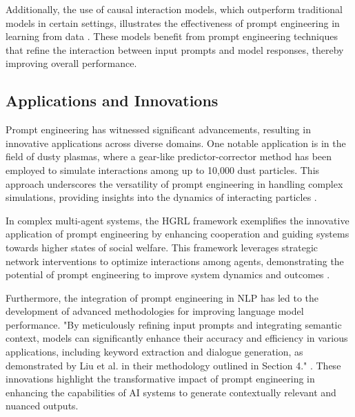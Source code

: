 Additionally, the use of causal interaction models, which outperform traditional models in certain settings, illustrates the effectiveness of prompt engineering in learning from data \cite{meek2015structureparameterlearningcausal}. These models benefit from prompt engineering techniques that refine the interaction between input prompts and model responses, thereby improving overall performance.





\subsection{Applications and Innovations} \label{subsec:Applications and Innovations}



Prompt engineering has witnessed significant advancements, resulting in innovative applications across diverse domains. One notable application is in the field of dusty plasmas, where a gear-like predictor-corrector method has been employed to simulate interactions among up to 10,000 dust particles. This approach underscores the versatility of prompt engineering in handling complex simulations, providing insights into the dynamics of interacting particles \cite{hou2008gearlikepredictorcorrectormethodbrownian}.



In complex multi-agent systems, the HGRL framework exemplifies the innovative application of prompt engineering by enhancing cooperation and guiding systems towards higher states of social welfare. This framework leverages strategic network interventions to optimize interactions among agents, demonstrating the potential of prompt engineering to improve system dynamics and outcomes \cite{chen2024adaptivenetworkinterventioncomplex}.



Furthermore, the integration of prompt engineering in NLP has led to the development of advanced methodologies for improving language model performance. "By meticulously refining input prompts and integrating semantic context, models can significantly enhance their accuracy and efficiency in various applications, including keyword extraction and dialogue generation, as demonstrated by Liu et al. in their methodology outlined in Section 4." \cite{altuncu2022improvingperformanceautomatickeyword}. These innovations highlight the transformative impact of prompt engineering in enhancing the capabilities of AI systems to generate contextually relevant and nuanced outputs.



